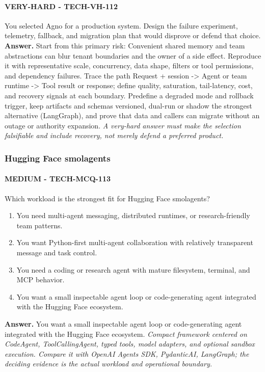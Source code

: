 \paragraph{VERY-HARD - TECH-VH-112} You selected Agno for a production system. Design the failure experiment, telemetry, fallback, and migration plan that would disprove or defend that choice.
\textbf{Answer.} Start from this primary risk: Convenient shared memory and team abstractions can blur tenant boundaries and the owner of a side effect. Reproduce it with representative scale, concurrency, data shape, filters or tool permissions, and dependency failures. Trace the path Request + session -> Agent or team runtime -> Tool result or response; define quality, saturation, tail-latency, cost, and recovery signals at each boundary. Predefine a degraded mode and rollback trigger, keep artifacts and schemas versioned, dual-run or shadow the strongest alternative (LangGraph), and prove that data and callers can migrate without an outage or authority expansion.
\textit{A very-hard answer must make the selection falsifiable and include recovery, not merely defend a preferred product.}
\subsubsection*{Hugging Face smolagents}
\paragraph{MEDIUM - TECH-MCQ-113} Which workload is the strongest fit for Hugging Face smolagents?
\begin{enumerate}[label=\Alph*.]
\item You need multi-agent messaging, distributed runtimes, or research-friendly team patterns.
\item You want Python-first multi-agent collaboration with relatively transparent message and task control.
\item You need a coding or research agent with mature filesystem, terminal, and MCP behavior.
\item You want a small inspectable agent loop or code-generating agent integrated with the Hugging Face ecosystem.
\end{enumerate}
\textbf{Answer.} You want a small inspectable agent loop or code-generating agent integrated with the Hugging Face ecosystem.
\textit{Compact framework centered on CodeAgent, ToolCallingAgent, typed tools, model adapters, and optional sandbox execution. Compare it with OpenAI Agents SDK, PydanticAI, LangGraph; the deciding evidence is the actual workload and operational boundary.}
